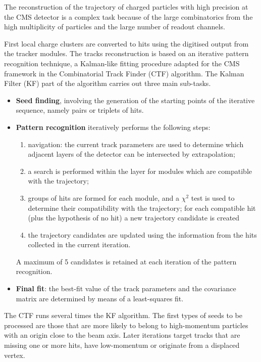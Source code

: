 The reconstruction of the trajectory of charged particles with high precision at the CMS detector
is a complex task because of the large combinatorics from the high multiplicity of particles and the large number of readout channels.

First local charge clusters are converted to hits using the digitised output from the tracker modules.
The tracks reconstruction is based on an iterative pattern recognition technique,
a Kalman-like fitting procedure adapted for the CMS framework in the Combinatorial Track Finder \cite{billoir.qian:simultaneous, Speer:2005dp} (CTF) algorithm.
The Kalman Filter (KF) part of the algorithm carries out three main sub-tasks.
\begin{itemize}
\item \textbf{Seed finding}, involving the generation of the starting points of the iterative sequence, namely pairs or triplets of hits.
\item \textbf{Pattern recognition} iteratively performs the following steps:
  \begin{enumerate}
  \item navigation: the current track parameters are used to determine which adjacent layers of the detector can be intersected by extrapolation;
  \item a search is performed within the layer for modules which are compatible with the trajectory;
  \item groups of hits are formed for each module, and a $\chi^2$ test is used to determine their compatibility with the trajectory;
    for each compatible hit (plus the hypothesis of no hit) a new trajectory candidate is created
  \item the trajectory candidates are updated using the information from the hits collected in the current iteration.
  \end{enumerate}
  A maximum of 5 candidates is retained at each iteration of the pattern recognition.
\item \textbf{Final fit}: the best-fit value of the track parameters and the covariance matrix are determined by means of a least-squares fit.
\end{itemize}
The CTF runs several times the KF algorithm.
The first types of seeds to be processed are those that are more likely to belong to high-momentum particles with an origin close to the beam axis.
Later iterations target tracks that are missing one or more hits, have low-momentum or originate from a displaced vertex.

